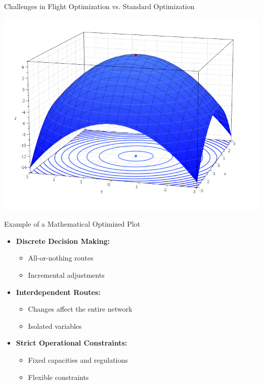 \documentclass[aspectratio=169,xcolor=dvipsnames]{beamer}
\begin{document}

\begin{frame}{Challenges in Flight Optimization vs. Standard Optimization}
    \begin{minipage}{0.45\textwidth}
        \centering
        \includegraphics[width=\textwidth]{images/MaximumParaboloid.png}
        \caption{Example of a Mathematical Optimized Plot}
    \end{minipage}%
    \hfill
    \begin{minipage}{0.5\textwidth}
        \begin{itemize}
            \item \textbf{Discrete Decision Making:}
            \begin{itemize}
                \item All-or-nothing routes
                \item Incremental adjustments
            \end{itemize}
            
            \item \textbf{Interdependent Routes:}
            \begin{itemize}
                \item Changes affect the entire network
                \item Isolated variables
            \end{itemize}
            
            \item \textbf{Strict Operational Constraints:}
            \begin{itemize}
                \item Fixed capacities and regulations
                \item Flexible constraints
            \end{itemize}
            

\end{itemize}
\end{minipage}
\end{frame}
\end{document}
